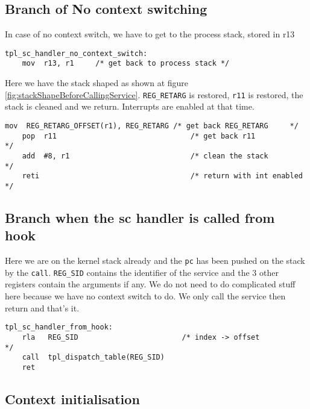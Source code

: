 \documentclass[11pt, oneside]{article}   	%
\begin{document}
\subsection{Branch of No context switching}

In case of no context switch, we have to get to the process stack, stored in r13

\begin{lstlisting}[backgroundcolor=\color{red!15}]
tpl_sc_handler_no_context_switch:
    mov  r13, r1	 /* get back to process stack */
\end{lstlisting}

Here we have the stack shaped as shown at figure \ref{fig:stackShapeBeforeCallingService}.
\lstinline{REG_RETARG} is restored, \lstinline{r11} is restored, the stack is cleaned and we return. Interrupts are enabled at that time.

\begin{lstlisting}[backgroundcolor=\color{yellow!15}]
    mov  REG_RETARG_OFFSET(r1), REG_RETARG /* get back REG_RETARG     */
    pop  r11                               /* get back r11            */
    add  #8, r1                            /* clean the stack         */
    reti                                   /* return with int enabled */
\end{lstlisting}

\subsection{Branch when the sc handler is called from hook}

Here we are on the kernel stack already and the \lstinline{pc} has been pushed on the stack by the \lstinline{call}. \lstinline{REG_SID} contains the identifier of the service and the 3 other registers contain the arguments if any. We do not need to do complicated stuff here because we have no context switch to do. We only call the service then return and that's it.

\begin{lstlisting}[backgroundcolor=\color{yellow!15}]
tpl_sc_handler_from_hook:
    rla   REG_SID                        /* index -> offset               */
    call  tpl_dispatch_table(REG_SID)
    ret
\end{lstlisting}

\subsection{Context initialisation}
\end{document}
